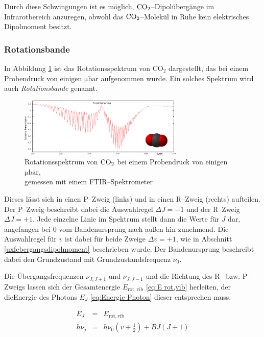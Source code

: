 \documentclass[12pt,a4paper]{scrartcl}
\numberwithin{equation}{section} %
\begin{document}
Durch diese Schwingungen ist es möglich, $\ce{CO_2}$--Dipolübergänge im Infrarotbereich anzuregen, obwohl das $\ce{CO_2}$--Molekül  in Ruhe kein elektrisches Dipolmoment besitzt. \cite{HakenWolf} %

\hypertarget{Rotationsbande}{\subsubsection{Rotationsbande}\label{Rotationsbande}}
In Abbildung \ref{fig:rotationsspektrumCO2} ist das Rotationsspektrum von CO$_2$ dargestellt, das bei einem Probendruck von einigen $\mathrm{\mu bar}$ aufgenommen wurde. Ein solches Spektrum wird auch \emph{Rotationsbande} genannt.

\begin{figure}[h!]
	\centering
	\includegraphics[width=0.7\textwidth]{../media/B1.1/Rotationssprektrum_CO2.png}
	\caption{Rotationsspektrum von $\ce{CO_2}$ bei einem Probendruck von einigen $\mathrm{\mu bar}$,\\
		gemessen mit einem FTIR--Spektrometer \cite{UzK}}
	\label{fig:rotationsspektrumCO2}
\end{figure}

Dieses lässt sich in einen P--Zweig (links) und in einen R--Zweig (rechts) aufteilen. Der P--Zweig beschreibt dabei die Auswahlregel $\Delta J = -1$ und der R--Zweig $\Delta J = +1$. Jede einzelne Linie im Spektrum stellt dann die Werte für $J$ dar, angefangen bei $0$ vom Bandenursprung nach außen hin zunehmend. Die Auswahlregel für $v$ ist dabei für beide Zweige $\Delta v = +1$, wie in Abschnitt \ref{uxfcbergangsdipolmoment} beschrieben wurde. Der Bandenursprung beschreibt dabei den Grundzustand mit Grundzustandsfrequenz $\nu_0$.

Die Übergangsfrequenzen $\nu_{J, J+1}$ und $\nu_{J, J-1}$ und die Richtung des R-- bzw. P--Zweigs lassen sich der Gesamtenergie $E_\mathrm{rot,vib}$ \eqref{eq:E rot,vib} herleiten, der dieEnergie des Photons $E_J$ \eqref{eq:Energie Photon} dieser entsprechen muss.

\begin{eqnarray}
	E_J &=& E_\mathrm{rot,vib} \\
	h \nu_j &=& h \nu_0 \left(v + \frac{1}{2}\right) + \tilde{B} J (J + 1)
\end{eqnarray}
\end{document}

